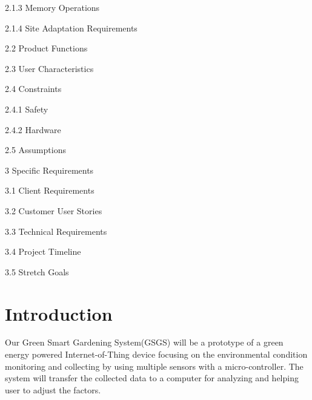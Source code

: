 \documentclass[IEEEtran,letterpaper,10pt,titlepage,fleqn,draftclsnofoot,onecolumn]{article}
\begin{document}
\vspace{1mm}

\small
2.1.3 Memory Operations

\vspace{1mm}

\small
2.1.4 Site Adaptation Requirements

\vspace{1mm}

\normalsize
2.2 Product Functions

\vspace{1mm}

\normalsize
2.3 User Characteristics

\vspace{1mm}

\normalsize
2.4 Constraints

\vspace{1mm}

\small
2.4.1 Safety

\vspace{1mm}

\small
2.4.2 Hardware

\vspace{1mm}

\normalsize
2.5 Assumptions

\vspace{5mm}

\large
3 Specific Requirements

\normalsize
3.1 Client Requirements

\vspace{1mm}

\normalsize
3.2 Customer User Stories

\vspace{1mm}

\normalsize
3.3 Technical Requirements

\vspace{1mm}

\normalsize
3.4 Project Timeline

\vspace{1mm}

\normalsize
3.5 Stretch Goals

\clearpage

\section{Introduction}

Our Green Smart Gardening System(GSGS) will be a prototype of a green energy powered Internet-of-Thing device focusing on the environmental condition monitoring and collecting by using multiple sensors with a micro-controller. The system will transfer the collected data to a computer for analyzing and helping user to adjust the factors.
\end{document}
